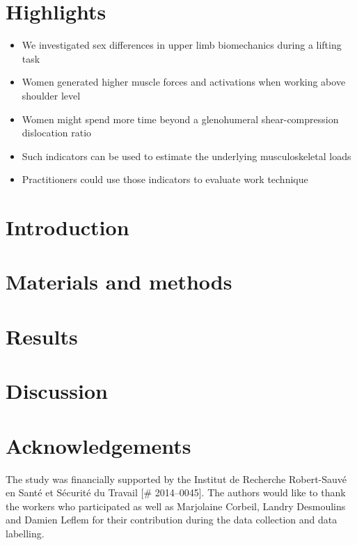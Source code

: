 \documentclass[preprint,review,12pt]{elsarticle}
\begin{document}
    \section{Highlights}\label{sec:highlights}
    \begin{itemize}
        \item We investigated sex differences in upper limb biomechanics during a lifting task
        \item Women generated higher muscle forces and activations when working above shoulder level
        \item Women might spend more time beyond a glenohumeral shear-compression dislocation ratio
        \item Such indicators can be used to estimate the underlying musculoskeletal loads
        \item Practitioners could use those indicators to evaluate work technique
    \end{itemize}

    \section{Introduction}\label{sec:introduction}
    

    \section{Materials and methods}\label{sec:materials-and-methods}
    

    \section{Results}\label{sec:results}
    

    \section{Discussion}\label{sec:discussion}
    

    \section{Acknowledgements}\label{sec:acknowledgements}

    The study was financially supported by the Institut de Recherche Robert-Sauvé en Santé et Sécurité du Travail [\# 2014--0045].
    The authors would like to thank the workers who participated as well as Marjolaine Corbeil, Landry Desmoulins and Damien Leflem for their contribution during the data collection and data labelling.

    \appendix
    

    
    
\end{document}
